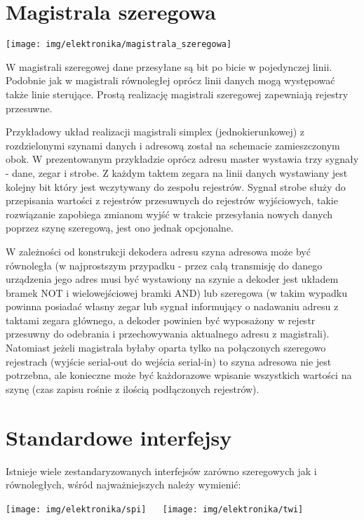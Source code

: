 \section{Magistrala szeregowa}

\begin{center}
    \texttt{[image: img/elektronika/magistrala\_szeregowa]}
\end{center}
W magistrali szeregowej dane przesyłane są bit po bicie w pojedynczej linii. Podobnie jak w magistrali równoległej oprócz linii danych mogą występować także linie sterujące. Prostą realizację magistrali szeregowej zapewniają rejestry przesuwne.

Przykładowy układ realizacji magistrali simplex (jednokierunkowej) z rozdzielonymi szynami danych i adresową został na schemacie zamieszczonym obok.
W prezentowanym przykładzie oprócz adresu master wystawia trzy sygnały - dane, zegar i strobe. Z każdym taktem zegara na linii danych wystawiany jest kolejny bit który jest wczytywany do zespołu rejestrów. Sygnał strobe służy do przepisania wartości z rejestrów przesuwnych do rejestrów wyjściowych, takie rozwiązanie zapobiega zmianom wyjść w trakcie przesyłania nowych danych poprzez szynę szeregową, jest ono jednak opcjonalne.

W zależności od konstrukcji dekodera adresu szyna adresowa może być równoległa (w najprostszym przypadku - przez całą transmisję do danego urządzenia jego adres musi być wystawiony na szynie a dekoder jest układem bramek NOT i wielowejściowej bramki AND) lub szeregowa (w takim wypadku powinna posiadać własny zegar lub sygnał informujący o nadawaniu adresu z taktami zegara głównego, a dekoder powinien być wyposażony w rejestr przesuwny do odebrania i przechowywania aktualnego adresu z magistrali). Natomiast jeżeli magistrala byłaby oparta tylko na połączonych szeregowo rejestrach (wyjście serial-out do wejścia serial-in) to szyna adresowa nie jest potrzebna, ale konieczne może być każdorazowe wpisanie wszystkich wartości na szynę (czas zapisu rośnie z ilością podłączonych rejestrów).

\section{Standardowe interfejsy}

Istnieje wiele zestandaryzowanych interfejsów zarówno szeregowych jak i równoległych, wśród najważniejszych należy wymienić:

\begin{center} \texttt{[image: img/elektronika/spi]}    \texttt{[image: img/elektronika/twi]} \end{center}

